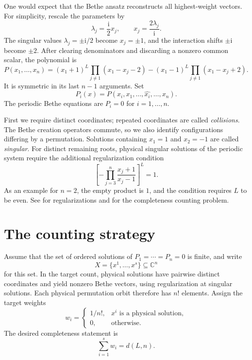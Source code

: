 \documentclass[11pt]{article}
\theoremstyle{definition}
\newcommand{\ii}{\mathrm i}
\newcommand{\C}{\mathbb C}
\begin{document}
One would expect that the Bethe ansatz reconstructs all highest-weight
vectors. For simplicity, rescale the parameters by
\[
 \lambda_j=\frac{\ii}{2}x_j,
 \qquad x_j=\frac{2\lambda_j}{\ii}.
\]
The singular values $\lambda_j=\pm\ii/2$ become $x_j=\pm1$, and the
interaction shifts $\pm\ii$ become $\pm2$.
After clearing denominators and discarding a nonzero common scalar,
the polynomial is
\begin{equation}\label{eq:polynomial}
	P(x_1,\ldots,x_n)=
	(x_1+1)^L\prod_{j\ne1}(x_1-x_j-2)
	-
	(x_1-1)^L\prod_{j\ne1}(x_1-x_j+2).
\end{equation}
It is symmetric in its last $n-1$ arguments. Set
\[
 P_i(x)=P(x_i,x_1,\ldots,\widehat{x_i},\ldots,x_n).
\]
The periodic Bethe equations are $P_i=0$ for $i=1,\ldots,n$.

First we require distinct coordinates; repeated coordinates are called
\emph{collisions}. The Bethe creation operators commute, so we also
identify configurations differing by a permutation. Solutions containing
$x_1=1$ and $x_2=-1$ are called \emph{singular}. For distinct remaining
roots, physical singular solutions of the periodic system require the
additional regularization condition
\begin{equation}\label{eq:physical}
 \left[-\prod_{j=3}^n
 \frac{x_j+1}{x_j-1}\right]^L=1.
\end{equation}
As an example for $n=2$, the empty product is $1$,
and the condition requires $L$ to be even.
See \cite{NW2013} for regularizations and
\cite{HNS2013} for the completeness counting problem.

\section{The counting strategy}
Assume that the set of ordered solutions of $P_1=\cdots=P_n=0$ is finite,
and write
\[
 X=\{x^1,\ldots,x^s\}\subseteq\C^n
\]
for this set. In the target count, physical solutions have pairwise
distinct coordinates and yield nonzero Bethe vectors, using
regularization at singular solutions. Each physical permutation orbit
therefore has $n!$ elements. Assign the target weights
\[
 w_i=\begin{cases}
 1/n!,&x^i\text{ is a physical solution},\\
 0,&\text{otherwise}.
 \end{cases}
\]
The desired completeness statement is
\begin{equation}\label{eq:target-weights}
 \sum_{i=1}^s w_i=d(L,n).
\end{equation}
\end{document}
